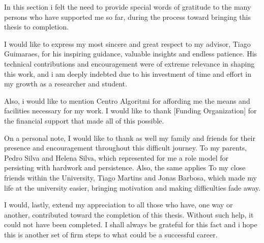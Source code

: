 In this section i felt the need to provide special words of gratitude to the many persons who have 
supported me so far, during the process toward bringing this thesis to completion.

I would like to express my most sincere and great 
respect to my advisor, Tiago Guimaraes, for his inspiring guidance, 
valuable insights and endless patience. His technical contributions and encouragement 
were of extreme relevance in shaping this work, and i am deeply indebted due to his investment 
of time and effort in my growth as a researcher and student.

Also, i would like to mention Centro Algoritmi for affording 
me the means and facilities necessary for my work. I would like to thank [Funding Organization] 
for the financial support that made all of this possible.

On a personal note, I would like to thank as well my family and 
friends for their presence and encouragement throughout this 
difficult journey. To my parents, Pedro Silva and Helena Silva, which represented for me a role model for persisting
with hardwork and persistence. Also, the same applies To my close friends within the University, 
Tiago Martins and Jonas Barbosa, which made my life at the university easier, 
bringing motivation and making difficulties fade away.

I would, lastly, extend my appreciation to all those who have, 
one way or another, contributed toward the completion of this thesis. Without such 
help, it could not have been completed. I shall always be grateful for 
this fact and i hope this is another set of firm steps to what could be a successful career.

\newpage